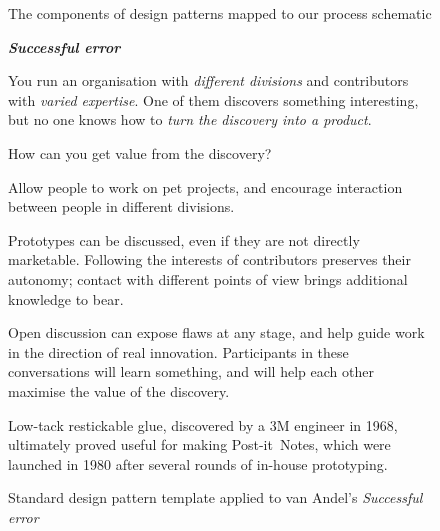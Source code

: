 
\begin{figure}

\caption{The components of design patterns mapped to our process schematic\label{fig:pattern-schematic}}
\end{figure}

\begin{figure}[!h]
\begin{mdframed}
\vspace{2mm}
\textbf{\emph{Successful error}}~
\begin{description}[leftmargin=0\parindent,labelindent=0em,itemsep=2pt]
\item[{Context.}] You run an organisation with {\sl different
  divisions} and contributors with {\sl varied expertise}.  One of
  them discovers something interesting, but no one knows how to {\sl
    turn the discovery into a product}.
\item[{Problem.}]  How can you get value from the discovery?
\item[{Solution.}] Allow people to work on pet projects, and encourage
  interaction between people in different divisions.
\item[{Rationale.}] Prototypes can be discussed, even if they are not
  directly marketable.  Following the interests of contributors
  preserves their autonomy; contact with different points of view
  brings additional knowledge to bear.
\item[{Resolution.}] 
Open discussion can
  expose flaws at any stage, and help guide work in the direction of
  real innovation.  Participants in these conversations
  will learn something, and will help each other maximise the value of
  the discovery.  
\item[{Example.}] Low-tack restickable glue, discovered by a 3M
  engineer in 1968, ultimately proved useful for making
  Post-it\texttrademark\ Notes, which were launched in 1980 after
  several rounds of in-house prototyping.
\end{description}
\vspace{-1mm}
\end{mdframed}
\caption{Standard design pattern template applied to van Andel's \em{Successful error}\label{fig:va-pattern-figure}}
\end{figure}
